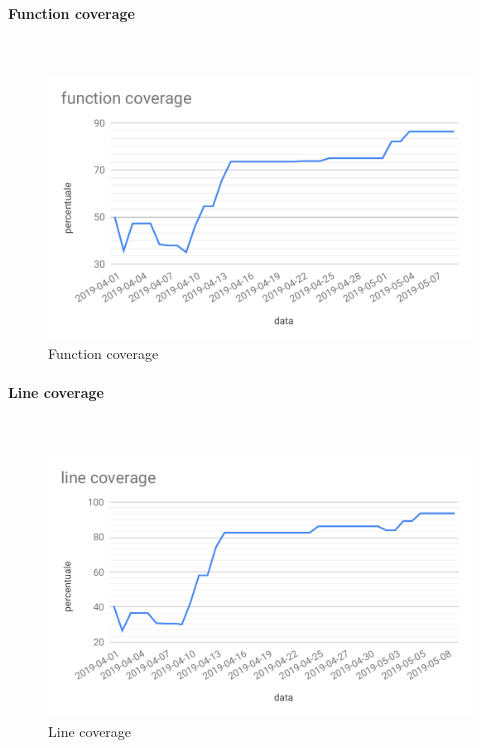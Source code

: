\paragraph{Function coverage}\mbox{}\\
\begin{figure}[H]
	\centering
	\includegraphics[scale=0.7]{res/images/RA/function-coverage.pdf}
	\caption{Function coverage}
\end{figure}
\paragraph{Line coverage}\mbox{}\\
\begin{figure}[H]
	\centering
	\includegraphics[scale=0.7]{res/images/RA/line-coverage.pdf}
	\caption{Line coverage}
\end{figure}
